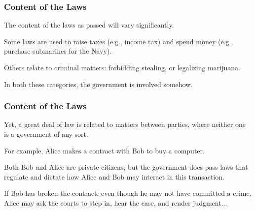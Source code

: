 \begin{frame}
\frametitle{Content of the Laws}

The content of the laws as passed will vary significantly.

Some laws are used to raise taxes (e.g., income tax) and spend money (e.g., purchase submarines for the Navy).

Others relate to criminal matters: forbidding stealing, or legalizing marijuana.

In both these categories, the government is involved somehow. 

\end{frame}



\begin{frame}
\frametitle{Content of the Laws}

Yet, a great deal of law is related to matters between parties, where neither one is a government of any sort.

For example, Alice makes a contract with Bob to buy a computer. 

Both Bob and Alice are private citizens, but the government does pass laws that regulate and dictate how Alice and Bob may interact in this transaction.

If Bob has broken the contract, even though he may not have committed a crime, Alice may ask the courts to step in, hear the case, and render judgment...


\end{frame}





